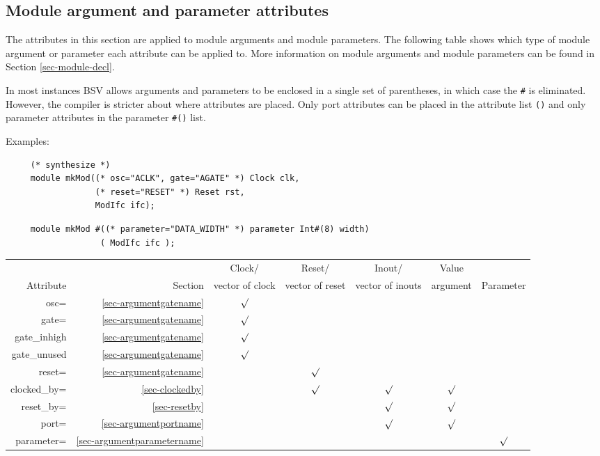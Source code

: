 \documentclass[twoside,letterpaper]{article}
\newcommand{\te}[1]{\texttt{#1}}
\begin{document}

\subsection{Module argument and parameter attributes}

\label{sec-modarg-att}

The attributes in this section are applied to module arguments and
module parameters. The
following table shows which type of module argument or parameter each
attribute can 
be applied to.  More information on module arguments and module
parameters can be found in Section \ref{sec-module-decl}. 

In most instances BSV allows arguments and parameters to be enclosed
in a single set of parentheses, in which case the \te{\#} is eliminated.
However, the compiler is stricter about where attributes are
placed. Only port attributes can be placed in the attribute list \te{()} and only parameter attributes in the parameter \te{\#()} list. 

Examples:

\begin{verbatim}
     (* synthesize *)
     module mkMod((* osc="ACLK", gate="AGATE" *) Clock clk, 
                  (* reset="RESET" *) Reset rst, 
                  ModIfc ifc);
\end{verbatim}

\begin{verbatim}
     module mkMod #((* parameter="DATA_WIDTH" *) parameter Int#(8) width) 
                   ( ModIfc ifc );
\end{verbatim}

\begin{center}
\begin{tabular}{|r|r|c|c|c|c|c|}
\hline
&&Clock/&Reset/&Inout/&Value&\\
Attribute &Section& vector of clock&vector of reset&vector of inouts& argument&Parameter\\
\hline 
\hline
osc=&\ref{sec-argumentgatename}&$\surd$&&&&\\
\hline
gate=&\ref{sec-argumentgatename}&$\surd$&&&&\\
\hline
gate\_inhigh&\ref{sec-argumentgatename}&$\surd$&&&&\\
\hline
gate\_unused&\ref{sec-argumentgatename}&$\surd$&&&&\\
\hline
reset=&\ref{sec-argumentgatename}&&$\surd$&&&\\
\hline
clocked\_by=&\ref{sec-clockedby}&&$\surd$&$\surd$&$\surd$&  \\
\hline
reset\_by=&\ref{sec-resetby}&&&$\surd$&$\surd$&\\
\hline
port=    &\ref{sec-argumentportname}&  &  &$\surd$ &$\surd$&    \\
\hline
parameter=&\ref{sec-argumentparametername}&&&&&$\surd$\\
\hline
\end{tabular}
\end{center}
\end{document}
